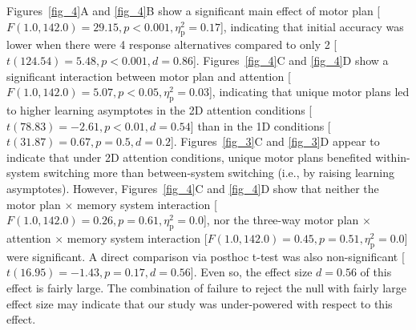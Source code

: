 \documentclass[doc, floatsintext]{apa7}
\begin{document}
Figures~\ref{fig_4}A and \ref{fig_4}B show a significant
main effect of motor plan [$F(1.0, 142.0) = 29.15, p <
0.001, \eta_{\text{p}}^{2} = 0.17$], indicating that initial
accuracy was lower when there were 4 response alternatives
compared to only 2 [$t(124.54) = 5.48, p < 0.001, d =
0.86$]. Figures~\ref{fig_4}C and \ref{fig_4}D show a
significant interaction between motor plan and attention
[$F(1.0, 142.0) = 5.07, p < 0.05, \eta_{\text{p}}^{2} =
0.03$], indicating that unique motor plans led to higher
learning asymptotes in the 2D attention conditions
[$t(78.83) = -2.61, p < 0.01, d = 0.54$] than in the 1D
conditions [$t(31.87) = 0.67, p = 0.5, d = 0.2$].
Figures~\ref{fig_3}C and \ref{fig_3}D appear to indicate
that under 2D attention conditions, unique motor plans
benefited within-system switching more than between-system
switching (i.e., by raising learning asymptotes). However,
Figures~\ref{fig_4}C and \ref{fig_4}D show that neither the
motor plan $\times$ memory system interaction [$F(1.0,
142.0) = 0.26, p = 0.61, \eta_{\text{p}}^{2} = 0.0$], nor
the three-way motor plan $\times$ attention $\times$ memory
system interaction [$F(1.0, 142.0) = 0.45, p = 0.51,
\eta_{\text{p}}^{2} = 0.0$] were significant. A direct
comparison via posthoc t-test was also non-significant
[$t(16.95) = -1.43, p = 0.17, d = 0.56$]. Even so, the
effect size $d=0.56$ of this effect is fairly large. The
combination of failure to reject the null with fairly large
effect size may indicate that our study was under-powered
with respect to this effect.

%
%

\end{document}
